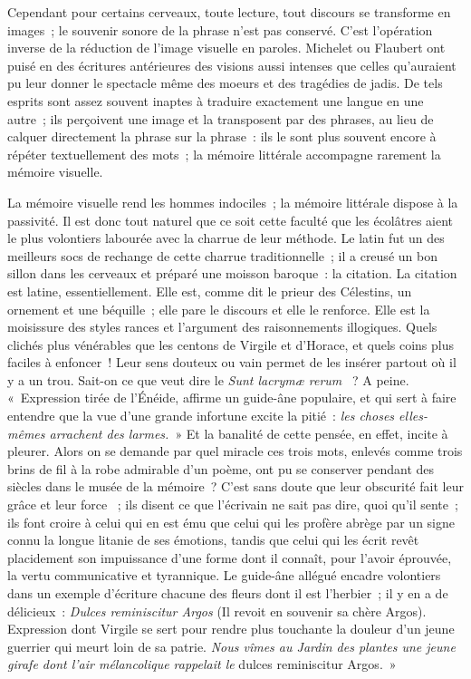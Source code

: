 \documentclass[french,twoside]{book} %
\begin{document}
Cependant pour certains cerveaux, toute lecture, tout discours se transforme en images ; le souvenir sonore de la phrase n’est pas conservé. C’est l’opération inverse de la réduction de l’image visuelle en paroles. Michelet ou Flaubert ont puisé en des écritures antérieures des visions aussi intenses que celles qu’auraient pu leur donner le spectacle même des moeurs et des tragédies de jadis. De tels esprits sont assez souvent inaptes à traduire exactement une langue en une autre ; ils perçoivent une image et la transposent par des phrases, au lieu de calquer directement la phrase sur la phrase : ils le sont plus souvent encore à répéter textuellement des mots ; la mémoire littérale accompagne rarement la mémoire visuelle.\par
La mémoire visuelle rend les hommes indociles ; la mémoire littérale dispose à la passivité. Il est donc tout naturel que ce soit cette faculté que les écolâtres aient le plus volontiers labourée avec la charrue de leur méthode. Le latin fut un des meilleurs socs de rechange de cette charrue traditionnelle ; il a creusé un bon sillon dans les cerveaux et préparé une moisson baroque : la citation. La citation est latine, essentiellement. Elle est, comme dit le prieur des Célestins, un ornement et une béquille ; elle pare le discours et elle le renforce. Elle est la moisissure des styles rances et l’argument des raisonnements illogiques. Quels clichés plus vénérables que les centons de Virgile et d’Horace, et quels coins plus faciles à enfoncer ! Leur sens douteux ou vain permet de les insérer partout où il y a un trou. Sait-on ce que veut dire le {\itshape Sunt lacrymæ rerum}  ? A peine. « Expression tirée de l’Énéide, affirme un guide-âne populaire, et qui sert à faire entendre que la vue d’une grande infortune excite la pitié : {\itshape les choses elles-mêmes arrachent des larmes.} » Et la banalité de cette pensée, en effet, incite à pleurer. Alors on se demande par quel miracle ces trois mots, enlevés comme trois brins de fil à la robe admirable d’un poème, ont pu se conserver pendant des siècles dans le musée de la mémoire ? C’est sans doute que leur obscurité fait leur grâce et leur force  ; ils disent ce que l’écrivain ne sait pas dire, quoi qu’il sente ; ils font croire à celui qui en est ému que celui qui les profère abrège par un signe connu la longue litanie de ses émotions, tandis que celui qui les écrit revêt placidement son impuissance d’une forme dont il connaît, pour l’avoir éprouvée, la vertu communicative et tyrannique. Le guide-âne allégué encadre volontiers dans un exemple d’écriture chacune des fleurs dont il est l’herbier ; il y en a de délicieux : {\itshape Dulces reminiscitur Argos} (Il revoit en souvenir sa chère Argos). Expression dont Virgile se sert pour rendre plus touchante la douleur d’un jeune guerrier qui meurt loin de sa patrie. {\itshape Nous vîmes au Jardin des plantes une jeune girafe dont l’air mélancolique rappelait le} dulces reminiscitur Argos. »\par
\end{document}
